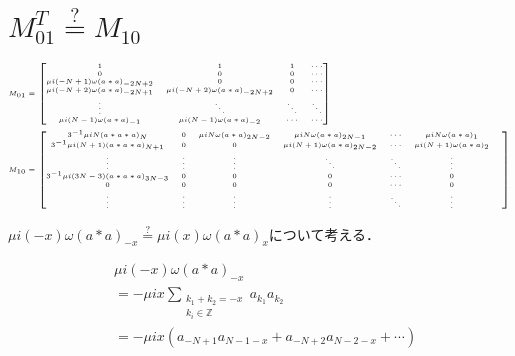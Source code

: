\documentclass[11pt,a4paper,titlepage]{jsreport}
\theoremstyle{definition}
\begin{document}
\section*{$M_{01}^T \stackrel{\mathrm{?}}{=} M_{10}$}
\begin{equation}
  \tiny
  \begin{split}
    &M_{01}
    =\begin{bmatrix}
      1 & 1 & 1 & \cdots\\
      0 & 0 & 0 & \cdots\\
      \mu i (-N+1) \omega (a*a)_{-2N+2} & 0 & 0 & \cdots\\
      \mu i (-N+2) \omega (a*a)_{-2N+1} & \mu i (-N+2) \omega (a*a)_{-2N+2} & 0 & \cdots \\
      \vdots & \ddots & \ddots & \ddots \\
      \mu i (N-1) \omega (a*a)_{-1} & \mu i (N-1) \omega (a*a)_{-2}  & \cdots & \cdots
    \end{bmatrix}\\
    &M_{10}
    = \begin{bmatrix}
      3^{-1}\mu i N (a*a*a)_{N} & 0 & \mu i N \omega (a*a)_{2N-2} & \mu i N \omega (a*a)_{2N-1} & \cdots & \mu i N \omega (a*a)_1 &\\
      3^{-1}\mu i (N+1) (a*a*a)_{N+1} & 0 & 0 & \mu i (N+1) \omega (a*a)_{2N-2} & \cdots & \mu i (N+1) \omega (a*a)_2 &\\
      \vdots & \vdots & \vdots & \ddots & \ddots & \vdots\\
      3^{-1}\mu i (3N-3) (a*a*a)_{3N-3}  & 0 & 0 & 0 & \cdots & 0\\
      0 & 0 & 0 & 0 & \cdots & 0 \\
      \vdots & \vdots & \vdots & \vdots & \ddots & \vdots\\
    \end{bmatrix}
  \end{split}
\end{equation}

$\mu i (-x) \omega (a*a)_{-x} \stackrel{\mathrm{?}}{=} \mu i (x) \omega (a*a)_{x}$について考える．

\begin{equation}
  \begin{split}
    &\mu i (-x) \omega (a*a)_{-x}\\
    &= -\mu ix \sum_{\substack{k_1+k_2=-x \\ k_i\in\mathbb{Z}}} a_{k_1}a_{k_2}\\
    &= -\mu ix (a_{-N+1}a_{N-1-x}+a_{-N+2}a_{N-2-x}+\cdots)
  \end{split}
\end{equation}
\end{document}
